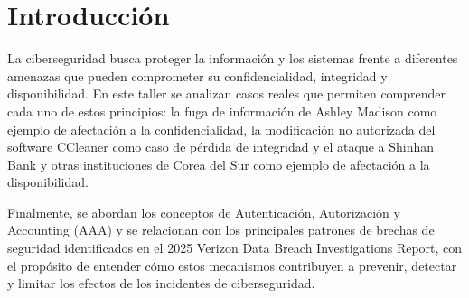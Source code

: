 \section*{Introducción}
La ciberseguridad busca proteger la información y los sistemas frente a diferentes amenazas que pueden comprometer su confidencialidad, integridad y disponibilidad. En este taller se analizan casos reales que permiten comprender cada uno de estos principios: la fuga de información de Ashley Madison como ejemplo de afectación a la confidencialidad, la modificación no autorizada del software CCleaner como caso de pérdida de integridad y el ataque a Shinhan Bank y otras instituciones de Corea del Sur como ejemplo de afectación a la disponibilidad.

Finalmente, se abordan los conceptos de Autenticación, Autorización y Accounting (AAA) y se relacionan con los principales patrones de brechas de seguridad identificados en el 2025 Verizon Data Breach Investigations Report, con el propósito de entender cómo estos mecanismos contribuyen a prevenir, detectar y limitar los efectos de los incidentes de ciberseguridad.
